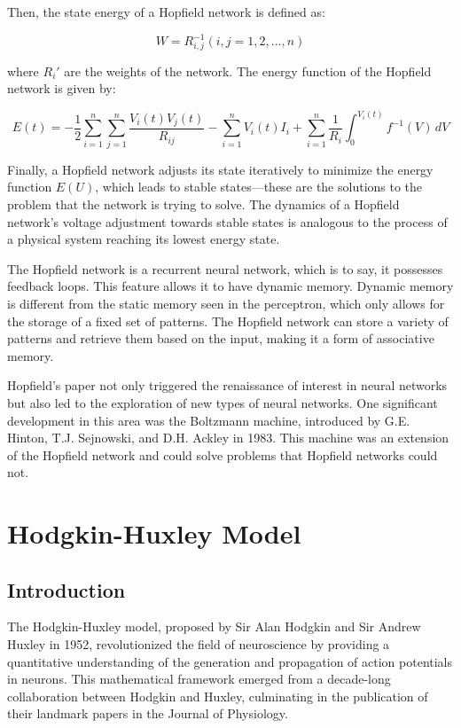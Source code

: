 \documentclass[12pt,a4paper]{report}
\begin{document}
Then, the state energy of a Hopfield network is defined as:

\begin{equation}
W = R_{i,j}^{-1} (i,j=1,2,...,n)
\end{equation}

where \( R_i' \) are the weights of the network. The energy function of the Hopfield network is given by:

\begin{equation}
    E(t) = -\frac{1}{2} \sum_{i=1}^{n} \sum_{j=1}^{n} \frac{V_i(t)V_j(t)}{R_{ij}} - \sum_{i=1}^{n} V_i(t)I_i + \sum_{i=1}^{n} \frac{1}{R_i} \int_{0}^{V_i(t)} f^{-1}(V) \, dV
\end{equation}

Finally, a Hopfield network adjusts its state iteratively to minimize the energy function \( E(U) \), which leads to stable states—these are the solutions to the problem that the network is trying to solve. The dynamics of a Hopfield network's voltage adjustment towards stable states is analogous to the process of a physical system reaching its lowest energy state.

The Hopfield network is a recurrent neural network, which is to say, it possesses feedback loops. This feature allows it to have dynamic memory. Dynamic memory is different from the static memory seen in the perceptron, which only allows for the storage of a fixed set of patterns. The Hopfield network can store a variety of patterns and retrieve them based on the input, making it a form of associative memory.

Hopfield's paper not only triggered the renaissance of interest in neural networks but also led to the exploration of new types of neural networks. One significant development in this area was the Boltzmann machine, introduced by G.E. Hinton, T.J. Sejnowski, and D.H. Ackley in 1983. This machine was an extension of the Hopfield network and could solve problems that Hopfield networks could not.


\chapter{Hodgkin-Huxley Model}

\section{Introduction}

The Hodgkin-Huxley model, proposed by Sir Alan Hodgkin and Sir Andrew Huxley in 1952, revolutionized the field of neuroscience by providing a quantitative understanding of the generation and propagation of action potentials in neurons. This mathematical framework emerged from a decade-long collaboration between Hodgkin and Huxley, culminating in the publication of their landmark papers in the Journal of Physiology.
\end{document}
